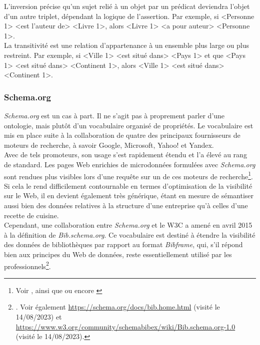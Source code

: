 \documentclass[a4paper,12pt,twoside]{book}
\begin{document}
L'inversion précise qu'un sujet relié à un objet par un prédicat deviendra l'objet d'un autre triplet, dépendant la logique de l'assertion. Par exemple, si \textless Personne 1\textgreater{} \textless est l'auteur de\textgreater{} \textless Livre 1\textgreater, alors \textless Livre 1\textgreater{} \textless a pour auteur\textgreater{} \textless Personne 1\textgreater.\\

La transitivité est une relation d'appartenance à un ensemble plus large ou plus restreint. Par exemple, si \textless Ville 1\textgreater{} \textless est situé dans\textgreater{} \textless Pays 1\textgreater{} et que \textless Pays 1\textgreater{} \textless est situé dans\textgreater{} \textless Continent 1\textgreater, alors \textless Ville 1\textgreater{} \textless est situé dans\textgreater{} \textless Continent 1\textgreater. 

\subsubsection{Schema.org}

\textit{Schema.org} est un cas à part. Il ne s'agit pas à proprement parler d'une ontologie, mais plutôt d'un vocabulaire organisé de propriétés. Le vocabulaire est mis en place suite à la collaboration de quatre des principaux fournisseurs de moteurs de recherche, à savoir Google, Microsoft, Yahoo! et Yandex.\\

Avec de tels promoteurs, son usage s'est rapidement étendu et l'a élevé au rang de standard. Les pages Web enrichies de microdonnées formulées avec \textit{Schema.org} sont rendues plus visibles lors d'une requête sur un de ces moteurs de recherche\footnote{Voir \cite[p.~87-88]{arnouldModelisationOntologiquePsychologies2021}, ainsi que \cite[p.~83]{mesguichBibliothequesWebEst2017} ou encore \cite[p.~129-132]{bermesWebSemantiqueBibliotheque2013}}. Si cela le rend difficilement contournable en termes d'optimisation de la visibilité sur le Web, il en devient également très générique, étant en mesure de sémantiser aussi bien des données relatives à la structure d'une entreprise qu'à celles d'une recette de cuisine.\\

Cependant, une collaboration entre \textit{Schema.org} et le W3C a amené en avril 2015 à la définition de \textit{Bib.schema.org}. Ce vocabulaire est destiné à étendre la visibilité des données de bibliothèques par rapport au format \textit{Bibframe}, qui, s'il répond bien aux principes du Web de données, reste essentiellement utilisé par les professionnels\footnote{\cite[p.~56-57]{bermesVersNouveauxCatalogues2016}. Voir également \url{https://schema.org/docs/bib.home.html} (visité le 14/08/2023) et \url{https://www.w3.org/community/schemabibex/wiki/Bib.schema.org-1.0} (visité le 14/08/2023).}.\\
\end{document}
